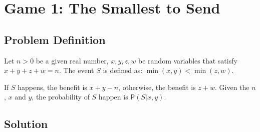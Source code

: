 \documentclass[10pt,a4paper]{article}
\author{Min Zhou}
\newcommand{\prob}{\mathsf{P}}
\begin{document}
\section{Game 1: The Smallest to Send}

\subsection{Problem Definition}
Let $n > 0$ be a given real number, $x, y, z, w$ be random variables that satisfy $x + y + z + w = n$. The event $S$ is defined as: $\min(x, y) < \min(z, w)$.

If $S$ happens, the benefit is $x + y - n$, otherwise, the benefit is $z + w$. Given the $n$, $x$ and $y$, the probability of $S$ happen is $\prob(S|x,y)$.



\subsection{Solution}
\end{document}
